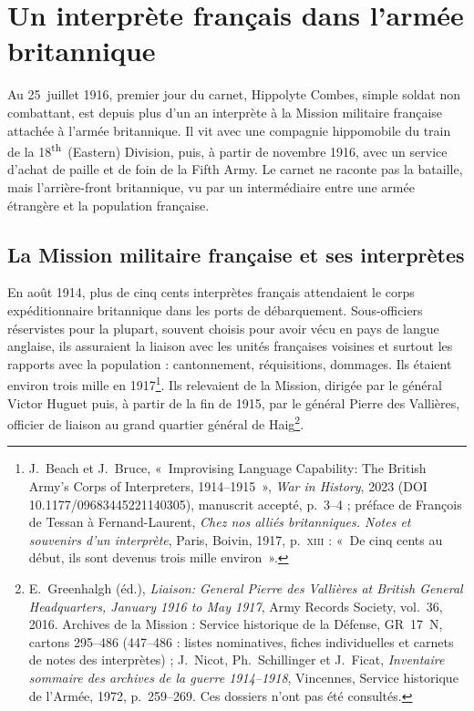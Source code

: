 \section{Un interprète français dans l'armée britannique}

Au 25~juillet 1916, premier jour du carnet, Hippolyte Combes, simple soldat non combattant, est depuis plus d'un an interprète à la Mission militaire française attachée à l'armée britannique. Il vit avec une compagnie hippomobile du train de la 18\textsuperscript{th}~(Eastern) Division, puis, à partir de novembre 1916, avec un service d'achat de paille et de foin de la Fifth Army. Le carnet ne raconte pas la bataille, mais l'arrière-front britannique, vu par un intermédiaire entre une armée étrangère et la population française.

\subsection{La Mission militaire française et ses interprètes}

En août 1914, plus de cinq cents interprètes français attendaient le corps expéditionnaire britannique dans les ports de débarquement. Sous-officiers réservistes pour la plupart, souvent choisis pour avoir vécu en pays de langue anglaise, ils assuraient la liaison avec les unités françaises voisines et surtout les rapports avec la population : cantonnement, réquisitions, dommages. Ils étaient environ trois mille en 1917\footnote{J.~Beach et J.~Bruce, «~Improvising Language Capability: The British Army's Corps of Interpreters, 1914--1915~», \textit{War in History}, 2023 (DOI 10.1177/09683445221140305), manuscrit accepté, p.~3--4 ; préface de François de Tessan à Fernand-Laurent, \textit{Chez nos alliés britanniques. Notes et souvenirs d'un interprète}, Paris, Boivin, 1917, p.~\textsc{xiii} : «~De cinq cents au début, ils sont devenus trois mille environ~».}. Ils relevaient de la Mission, dirigée par le général Victor Huguet puis, à partir de la fin de 1915, par le général Pierre des Vallières, officier de liaison au grand quartier général de Haig\footnote{E.~Greenhalgh (éd.), \textit{Liaison: General Pierre des Vallières at British General Headquarters, January 1916 to May 1917}, Army Records Society, vol.~36, 2016. Archives de la Mission : Service historique de la Défense, GR~17~N, cartons 295--486 (447--486 : listes nominatives, fiches individuelles et carnets de notes des interprètes) ; J.~Nicot, Ph.~Schillinger et J.~Ficat, \textit{Inventaire sommaire des archives de la guerre 1914--1918}, Vincennes, Service historique de l'Armée, 1972, p.~259--269. Ces dossiers n'ont pas été consultés.}.

